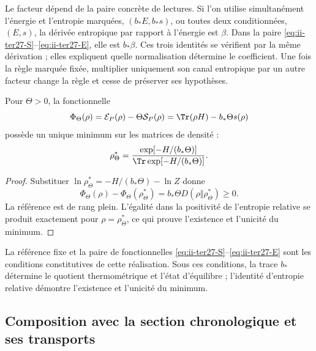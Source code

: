 Le facteur dépend de la paire concrète de lectures. Si l’on utilise
simultanément l’énergie et l’entropie marquées, $(b_*E,b_*s)$, ou toutes deux
conditionnées, $(E,s)$, la dérivée entropique par rapport à l’énergie est
$\beta$. Dans la paire \eqref{eq:ii-ter27-S}--\eqref{eq:ii-ter27-E},
elle est $b_*\beta$. Ces trois identités se vérifient par la même dérivation ;
elles expliquent quelle normalisation détermine le coefficient. Une fois la
règle marquée fixée, multiplier uniquement son canal entropique par un autre facteur change
la règle et cesse de préserver ses hypothèses.

\begin{corollary}
\label{cor:ii-ter27-variational}
Pour $\Theta>0$, la fonctionnelle
\[
 \Phi_\Theta(\rho)=\mathcal E_P(\rho)-\Theta\mathcal S_P(\rho)
 =\Tr(\rho H)-b_*\Theta s(\rho)
\]
possède un unique minimum sur les matrices de densité :
\begin{equation}
 \rho_\Theta^*=
 \frac{\exp[-H/(b_*\Theta)]}{\Tr\exp[-H/(b_*\Theta)]}.
 \label{eq:ii-ter27-minimum}
\end{equation}
\end{corollary}
\begin{proof}
Substituer $\ln\rho_\Theta^*=-H/(b_*\Theta)-\ln Z$ donne
\[
 \Phi_\Theta(\rho)-\Phi_\Theta(\rho_\Theta^*)
 =b_*\Theta D(\rho\Vert\rho_\Theta^*)\ge0.
\]
La référence est de rang plein. L’égalité dans la positivité de
l’entropie relative se produit exactement pour $\rho=\rho_\Theta^*$,
ce qui prouve l’existence et l’unicité du minimum.
\end{proof}

La référence fixe et la paire de fonctionnelles
\eqref{eq:ii-ter27-S}--\eqref{eq:ii-ter27-E} sont les conditions
constitutives de cette réalisation. Sous ces conditions, la trace $b_*$ détermine
le quotient thermométrique et l’état d’équilibre ; l’identité
d’entropie relative démontre l’existence et l’unicité du minimum.

\subsection{Composition avec la section chronologique et ses transports}
\label{subsec:ii-ter27-map}

